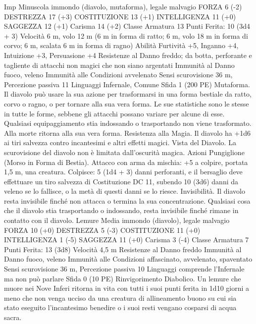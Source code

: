 \begin{multicols}{2}
Imp
Minuscola immondo (diavolo, mutaforma), legale malvagio
FORZA 6 (-2)
DESTREZZA 17 (+3)
COSTITUZIONE 13 (+1)
INTELLIGENZA 11 (+0)
SAGGEZZA 12 (+1)
Carisma 14 (+2)
Classe Armatura 13
\hspace*{0pt}\hfill{Punti Ferita}: 10 (3d4 + 3)
Velocità 6 m, volo 12 m (6 m in forma di ratto; 6 m, volo 18 m
in forma di corvo; 6 m, scalata 6 m in forma di ragno)
Abilità Furtività +5, Inganno +4, Intuizione +3, Persuasione +4
Resistenze al Danno freddo; da botta, perforante e tagliente
di attacchi non magici che non siano argentati
Immunità al Danno fuoco, veleno
Immunità alle Condizioni avvelenato
Sensi scurovisione 36 m, Percezione passiva 11
Linguaggi Infernale, Comune
Sfida 1 (200 PE)
Mutaforma. Il diavolo può usare la sua azione per trasformarsi
in una forma bestiale da ratto, corvo o ragno, o per tornare alla
sua vera forma. Le sue statistiche sono le stesse in tutte le forme,
sebbene gli attacchi possano variare per alcune di esse. Qualsiasi
equipaggiamento stia indossando o trasportando non viene
trasformato. Alla morte ritorna alla sua vera forma.
Resistenza alla Magia. Il diavolo ha +1d6 ai tiri salvezza
contro incantesimi e altri effetti magici.
Vista del Diavolo. La scurovisione del diavolo non è limitata
dall’oscurità magica.
Azioni
Pungiglione (Morso in Forma di Bestia). Attacco con arma da
mischia: +5 a colpire, portata 1,5 m, una creatura.
Colpisce: 5 (1d4 + 3) danni perforanti, e il bersaglio deve
effettuare un tiro salvezza di Costituzione DC 11, subendo 10
(3d6) danni da veleno se lo fallisce, o la metà di questi danni se
lo riesce.
Invisibilità. Il diavolo resta invisibile finché non attacca o
termina la sua concentrazione. Qualsiasi cosa che il diavolo stia
trasportando o indossando, resta invisibile finché rimane in
contatto con il diavolo.
Lemure
Media immondo (diavolo), legale malvagio
FORZA 10 (+0)
DESTREZZA 5 (-3)
COSTITUZIONE 11 (+0)
INTELLIGENZA 1 (-5)
SAGGEZZA 11 (+0)
Carisma 3 (-4)
Classe Armatura 7
\hspace*{0pt}\hfill{Punti Ferita}: 13 (3d8)
Velocità 4,5 m
Resistenze al Danno freddo
Immunità al Danno fuoco, veleno
Immunità alle Condizioni affascinato, avvelenato, spaventato
Sensi scurovisione 36 m, Percezione passiva 10
Linguaggi comprende l’Infernale ma non può parlare
Sfida 0 (10 PE)
Rinvigorimento Diabolico. Un lemure che muore nei Nove
Inferi ritorna in vita con tutti i suoi punti ferita in 1d10 giorni a
meno che non venga ucciso da una creatura di allineamento
buono su cui sia stato eseguito l’incantesimo benedire o i suoi
resti vengano cosparsi di acqua sacra.

\end{multicols}
